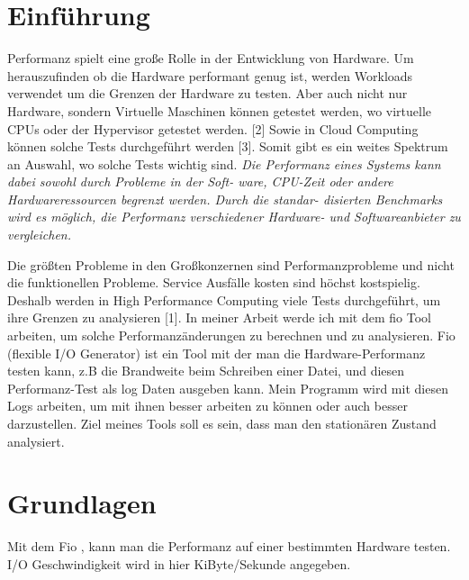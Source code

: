 \documentclass{article}
\begin{document}
\tableofcontents{}


\newpage
\section{Einführung}
Performanz spielt eine große Rolle in der Entwicklung von Hardware. Um herauszufinden ob die Hardware performant genug ist, werden Workloads
verwendet um die Grenzen der Hardware zu testen. Aber auch nicht nur Hardware, sondern Virtuelle Maschinen können getestet werden, 
wo virtuelle CPUs oder der Hypervisor getestet werden. [2]
Sowie in Cloud Computing können solche Tests durchgeführt werden [3]. Somit gibt es ein weites Spektrum an Auswahl, wo solche Tests wichtig sind.
\textit{Die Performanz eines Systems kann dabei sowohl durch Probleme in der Soft-
ware, CPU-Zeit oder andere Hardwareressourcen begrenzt werden. Durch die standar-
disierten Benchmarks wird es möglich, die Performanz verschiedener Hardware- und
Softwareanbieter zu vergleichen.}

Die größten Probleme in den Großkonzernen sind Performanzprobleme und nicht die funktionellen Probleme. Service Ausfälle kosten sind höchst kostspielig. 
Deshalb werden in High Performance Computing viele Tests durchgeführt, um ihre Grenzen zu analysieren [1].
In meiner Arbeit werde ich mit dem fio Tool arbeiten, um solche Performanzänderungen zu berechnen und zu analysieren.
Fio (flexible I/O Generator) ist ein Tool mit der man die Hardware-Performanz testen kann, z.B die Brandweite beim Schreiben einer Datei, und diesen Performanz-Test als log Daten ausgeben kann.
Mein Programm wird mit diesen Logs arbeiten, um mit ihnen besser arbeiten zu können oder auch besser darzustellen.
Ziel meines Tools soll es sein, dass man den stationären Zustand analysiert. 


\section{Grundlagen}
Mit dem Fio , kann man die Performanz auf einer bestimmten Hardware testen. I/O Geschwindigkeit wird in hier KiByte/Sekunde angegeben. 
\end{document}
